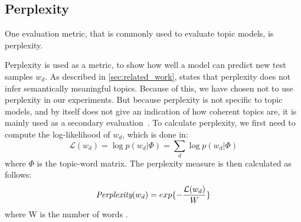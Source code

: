 \subsection{Perplexity}\label{app:perplexity}
One evaluation metric, that is commonly used to evaluate topic models, is perplexity.

Perplexity is used as a metric, to show how well a model can predict new test samples $w_d$.
As described in \autoref{sec:related_work}, \citet{tea_leaves} states that perplexity does not infer semantically meaningful topics.
Because of this, we have chosen not to use perplexity in our experiments.
But because perplexity is not specific to topic models, and by itself does not give an indication of how coherent topics are, it is mainly used as a secondary evaluation~\cite{tea_leaves}.
To calculate perplexity, we first need to compute the log-likelihood of $w_d$, which is done in:
\begin{equation}\label{eq:likelihood}
	\mathcal{L}(w_d) = \log p(w_d|\Phi) = \sum_{d} \log p(w_d|\Phi)
\end{equation}
\noindent where $\Phi$ is the topic-word matrix.
The perplexity measure is then calculated as follows:
\begin{equation}
	\emph{Perplexity}(w_d) = exp \{-\frac{\mathcal{L}(w_d)}{W}\}
\end{equation}
\noindent where W is the number of words \cite{de2008evaluating}.

